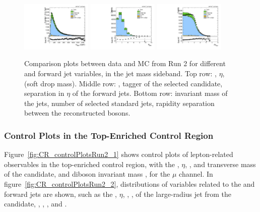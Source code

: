 \begin{figure}[htbp]
  \includegraphics[width=0.3\textwidth]{fig/controlPlots/SB_b1_allL_allP_allC_allD_Run2_lnujj_vbfMass.pdf}
  \includegraphics[width=0.3\textwidth]{fig/controlPlots/SB_b1_allL_allP_allC_allD_Run2_lnujj_nJets.pdf}
  \includegraphics[width=0.3\textwidth]{fig/controlPlots/SB_b1_allL_allP_allC_allD_Run2_dy.pdf}\\
  \caption{
    Comparison plots between data and MC from Run 2 for different \Vhad and \VBF forward jet variables, in the jet mass sideband.
    Top row: \pt, $\eta$, \MJ (soft drop mass).
    Middle row: \nsubjDDT, \DoubleB tagger of the selected \Vhad candidate, separation in $\eta$ of the \VBF forward jets.
    Bottom row: invariant mass of the \VBF jets, number of selected standard jets, rapidity separation between the reconstructed bosons.
  }
  \label{fig:SB_controlPlotsRun2_2}
\end{figure}

\subsubsection{Control Plots in the Top-Enriched Control Region}

Figure~\ref{fig:CR_controlPlotsRun2_1} shows control plots of lepton-related observables in the top-enriched control region, with the \pt, $\eta$, \ptmiss, \pt and transverse mass of the \Wlep candidate, and diboson invariant mass \MVV, for the $\mu$ channel.
In figure~\ref{fig:CR_controlPlotsRun2_2}, distributions of variables related to the \Vhad and \VBF forward jets are shown, such as the \pt, $\eta$, \MJ, \nsubjDDT, \DoubleB of the large-radius jet from the \Vhad candidate, \DetaVBF, \mjjVBF, \nJets, and \Dy.

